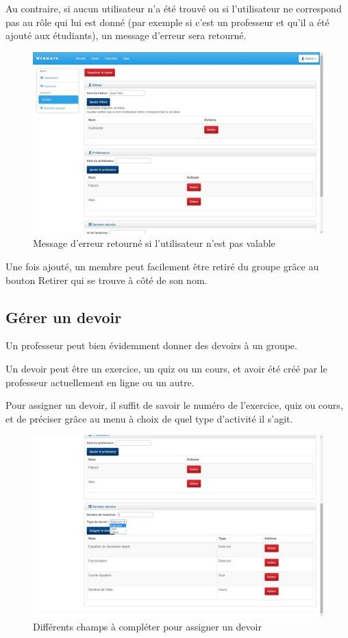 \documentclass[a4paper,10pt,french]{sphinxmanual}
\begin{document}
Au contraire, si aucun utilisateur n'a été trouvé ou si l'utilisateur ne
correspond pas au rôle qui lui est donné (par exemple si c'est un
professeur et qu'il a été ajouté aux étudiants), un message d'erreur sera
retourné.
\begin{figure}[htbp]
\centering
\capstart

\includegraphics[width=0.500\linewidth]{classAjouterMembresEchec.jpg}
\caption{Message d'erreur retourné si l'utilisateur n'est pas valable}\end{figure}

Une fois ajouté, un membre peut facilement être retiré du groupe grâce au bouton
Retirer qui se trouve à côté de son nom.


\subsection{Gérer un devoir}
\label{dashboard:gerer-un-devoir}
Un professeur peut bien évidemment donner des devoirs à un groupe.

Un devoir peut être un exercice, un quiz ou un cours, et avoir été créé
par le professeur actuellement en ligne ou un autre.

Pour assigner un devoir, il suffit de savoir le numéro de l'exercice, quiz ou
cours, et de préciser grâce au menu à choix de quel type d'activité il s'agit.
\begin{figure}[htbp]
\centering
\capstart

\includegraphics[width=0.500\linewidth]{classDevoir.jpg}
\caption{Différents champs à compléter pour assigner un devoir}\end{figure}
\end{document}
